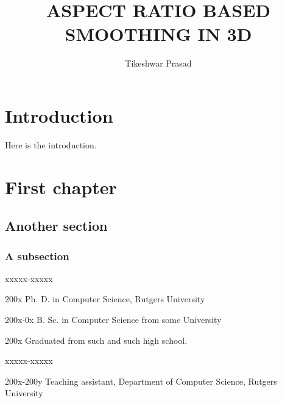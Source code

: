 \documentclass{ruthesis}
\begin{document}
\title{ASPECT RATIO BASED SMOOTHING IN 3D}
\author{Tikeshwar Prasad}



\beforepreface
{}
\dedication{The body of the dedication}
\afterpreface

\chapter{Introduction}
Here is the introduction.

\chapter{First chapter}
\section{Another section}
\subsection{A subsection}

\begin{vita}
 \vspace{15pt}
\begin{descriptionlist}{xxxxx-xxxxx} %
\item[200x] Ph. D. in Computer Science, Rutgers University
\item[200x-0x] B. Sc. in Computer Science from some University
\item[200x] Graduated from such and such high school.
\end{descriptionlist}
\medskip
\begin{descriptionlist}{xxxxx-xxxxx} %
\item[200x-200y] Teaching assistant, Department of Computer Science, Rutgers University
\end{descriptionlist}
\end{vita}
\end{document}
